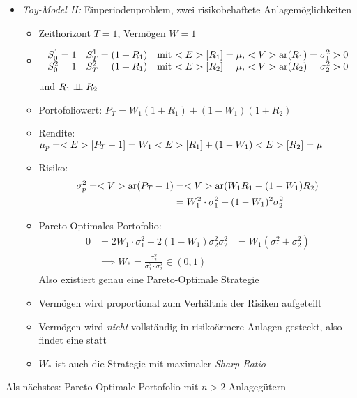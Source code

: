 \begin{itemize}
	\item \emph{Toy-Model II:} Einperiodenproblem, zwei risikobehaftete Anlagemöglichkeiten
	\begin{itemize}
		\item Zeithorizont $T=1$, Vermögen $W=1$
		\item 
		\begin{align*}
			\begin{matrix}
				S_0^1 = 1 & S_T^1 = (1+R_1) & \text{mit $<E>[R_1] = \mu$, $<V>\text{ar}(R_1) = \sigma_1^2 > 0$}\\
				S_0^2 = 1 & S_T^2 = (1+R_1) & \text{mit $<E>[R_2] = \mu$, $<V>\text{ar}(R_2) = \sigma_2^2 > 0$}
			\end{matrix}
		\end{align*}
		und $R_1 \perp\!\!\!\perp R_2$
		\item Portofoliowert: $P_T = W_1(1+R_1) + (1-W_1)(1+R_2)$
		\item Rendite: $\mu_p = <E>[P_T -1] = W_1<E>[R_1] + (1-W_1)<E>[R_2] = \mu$
		\item Risiko:
		\begin{align*}
			\sigma_p^2 = <V>\text{ar}(P_T -1) &= <V>\text{ar}(W_1 R_1 + (1-W_1)R_2)\\
			&= W^2_1\cdot \sigma_1^2 + (1-W_1)^2\sigma_2^2
		\end{align*}
		\item Pareto-Optimales Portofolio: 
		\begin{align*}
			0 &= 2W_1\cdot \sigma_1^2 - 2(1-W_1)\sigma_2^2
			\sigma_2^2 &= W_1(\sigma_1^2 + \sigma_2^2)\\
			&\implies W_{\ast} = \frac{\sigma_2^2}{\sigma_1^2\cdot \sigma_2^2} \in (0,1)
		\end{align*}
		Also existiert genau eine Pareto-Optimale Strategie
		\item Vermögen wird proportional zum Verhältnis der Risiken aufgeteilt
		\item Vermögen wird \emph{nicht} vollständig in risikoärmere Anlagen gesteckt, also findet eine  statt
		\item $W_{\ast}$ ist auch die Strategie mit maximaler \emph{Sharp-Ratio}
	\end{itemize}
\end{itemize}
Als nächstes: Pareto-Optimale Portofolio mit $n>2$ Anlagegütern
